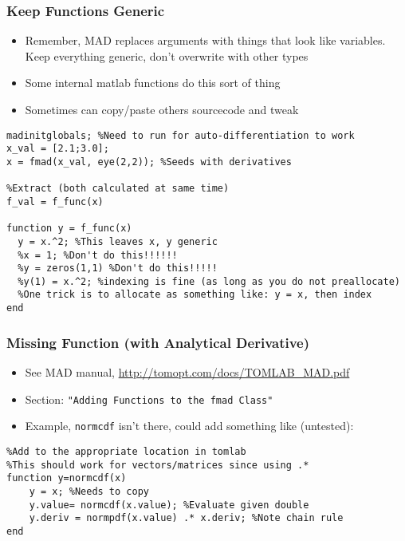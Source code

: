 \documentclass[nofootline]{etk-presentation}
\begin{document}
\begin{frame}[fragile]	\frametitle{Keep Functions Generic}
	\begin{itemize}
		\item Remember, MAD replaces arguments with things that look like variables.  Keep everything generic, don't overwrite with other types
		\item Some internal matlab functions do this sort of thing
		\item Sometimes can copy/paste others sourcecode and tweak
	\end{itemize}

\begin{verbatim}
madinitglobals; %Need to run for auto-differentiation to work
x_val = [2.1;3.0];
x = fmad(x_val, eye(2,2)); %Seeds with derivatives

%Extract (both calculated at same time)
f_val = f_func(x)

function y = f_func(x)
  y = x.^2; %This leaves x, y generic
  %x = 1; %Don't do this!!!!!!
  %y = zeros(1,1) %Don't do this!!!!!
  %y(1) = x.^2; %indexing is fine (as long as you do not preallocate)
  %One trick is to allocate as something like: y = x, then index
end
\end{verbatim}	

\end{frame}

\begin{frame}[fragile]	\frametitle{Missing Function (with Analytical Derivative)}
\begin{itemize}
	\item See MAD manual, \url{http://tomopt.com/docs/TOMLAB_MAD.pdf}
	\item Section: \verb!"Adding Functions to the fmad Class"!
	\item Example, \verb!normcdf! isn't there, could add something like (untested):
\end{itemize}

\begin{verbatim}
%Add to the appropriate location in tomlab
%This should work for vectors/matrices since using .*
function y=normcdf(x)
	y = x; %Needs to copy		
	y.value= normcdf(x.value); %Evaluate given double 
	y.deriv = normpdf(x.value) .* x.deriv; %Note chain rule
end
\end{verbatim}
\end{frame}
\end{document}
